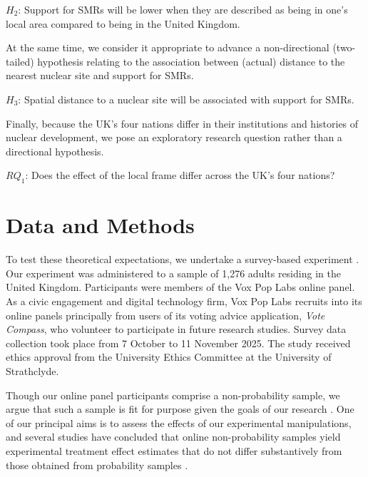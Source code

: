 \documentclass[a4paper, 11pt]{article}
\begin{document}
$H_2$: Support for SMRs will be lower when they are described as being in one's local area compared to being in the United Kingdom.

At the same time, we consider it appropriate to advance a non-directional (two-tailed) hypothesis relating to the association between (actual) distance to the nearest nuclear site and support for SMRs.

$H_3$: Spatial distance to a nuclear site will be associated with support for SMRs.

Finally, because the UK's four nations differ in their institutions and histories of nuclear development, we pose an exploratory research question rather than a directional hypothesis.

$\mathit{RQ}_1$: Does the effect of the local frame differ across the UK's four nations?

\section{Data and Methods}

To test these theoretical expectations, we undertake a survey-based experiment \citep{druckman2022,mutz2011}. Our experiment was administered to a sample of 1,276 adults residing in the United Kingdom. Participants were members of the Vox Pop Labs online panel. As a civic engagement and digital technology firm, Vox Pop Labs recruits into its online panels principally from users of its voting advice application, \emph{Vote Compass}, who volunteer to participate in future research studies. Survey data collection took place from 7 October to 11 November 2025. The study received ethics approval from the University Ethics Committee at the University of Strathclyde.

Though our online panel participants comprise a non-probability sample, we argue that such a sample is fit for purpose given the goals of our research \citep[cf.][]{baker2013}. One of our principal aims is to assess the effects of our experimental manipulations, and several studies have concluded that online non-probability samples yield experimental treatment effect estimates that do not differ substantively from those obtained from probability samples \citep{coppock2018,krupnikov2014,mullinix2015}.
\end{document}
